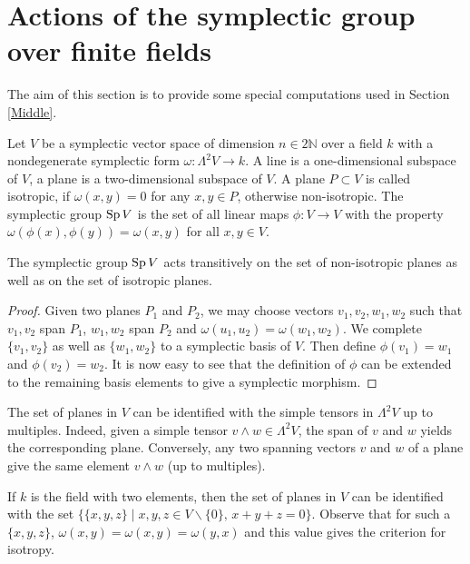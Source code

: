 \section{Actions of the symplectic group over finite fields}\label{Section_Symplectic}
The aim of this section is to provide some special computations used in Section \ref{Middle}.

Let $V$ be a symplectic vector space of dimension $n\in 2\mathbb{N}$ over a field $k$ with a nondegenerate symplectic form $\omega : \Lambda^2 V \rightarrow k$. A line is a one-dimensional subspace of $V$, a plane is a two-dimensional subspace of $V$. A plane $P\subset V$ is called isotropic, if $\omega (x,y)=0$ for any $x,y\in P$, otherwise non-isotropic.  The symplectic group $\operatorname{Sp} V$ is the set of all linear maps $\phi : V\rightarrow V$ with the property $\omega(\phi(x),\phi(y)) = \omega(x,y)$ for all $ x,y\in V$.
\begin{proposition}
The symplectic group $\operatorname{Sp} V$ acts transitively on the set of non-isotropic planes as well as on the set of isotropic planes.
\end{proposition}
\begin{proof}
Given two planes $P_1$ and $P_2$, we may choose vectors $v_1,v_2,w_1,w_2$ such that $v_1,v_2$ span $P_1$, $w_1,w_2$ span $P_2$ and $\omega(u_1,u_2) =\omega(w_1,w_2)$. We complete $\{v_1,v_2\}$ as well as $\{w_1,w_2\}$ to a symplectic basis of $V$.
Then define $\phi(v_1)=w_1$ and $\phi(v_2)=w_2$. 
It is now easy to see that the definition of $\phi$ can be extended to the remaining basis elements to give a symplectic morphism.
\end{proof}
\begin{remark}
The set of planes in $V$ can be identified with the simple tensors in $\Lambda^2V$ up to multiples. Indeed, given a simple tensor $v\wedge w \in \Lambda^2 V$, the span of $v$ and $w$ yields the corresponding plane. Conversely, any two spanning vectors $v$ and $w$ of a plane give the same element $v\wedge w$ (up to multiples).
\end{remark}
\begin{remark} \label{PlaneTriple}
 If $k$ is the field with two elements, then the set of planes in $V$ can be identified with the set $\{\{x,y,z\}\;|\;x,y,z\in V\backslash\{0\},\,x+y+z=0\}$. Observe that for such a $\{x,y,z\}$, $\omega(x,y)=\omega(x,y)=\omega(y,x)$ and this value gives the criterion for isotropy.
\end{remark}

